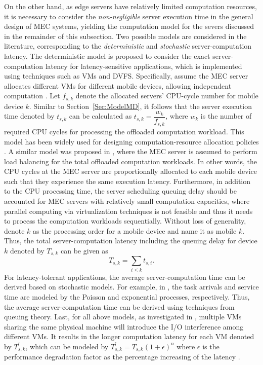 \documentclass[journal]{IEEEtran}
\begin{document}
On the other hand, as edge servers have relatively limited computation resources, it is necessary to consider the \emph{non-negligible} server execution time in the general design of MEC systems, yielding the computation model for the severs discussed in the remainder of this subsection. Two possible models  are considered  in the literature, corresponding to  the \emph{deterministic} and \emph{stochastic} server-computation latency. The deterministic model is proposed to consider the exact server-computation latency  for latency-sensitive applications, which is implemented using  techniques such as VMs and DVFS.
Specifically, assume the MEC server allocates different VMs for different mobile devices, allowing independent computation \cite{barham2003xen}. Let $f_{s,k}$ denote the allocated servers' CPU-cycle number for mobile device $k$. Similar to Section~\ref{Sec:ModelMD}, it follows that the server execution time denoted by $t_{s,k}$ can be calculated as $t_{s,k} = \dfrac{w_k}{f_{{s,k}}}$, where $w_k$ is the number of required CPU cycles for processing the offloaded computation workload. This model has been widely used for designing computation-resource allocation policies  \cite{barbarossa2013joint,chen2015efficient,lyumulti:2016:ProxiCloud}. A similar model was proposed in \cite{you2016energy}, where the MEC server is assumed to perform load balancing for the total offloaded computation workloads. In other words, the CPU cycles at the MEC server are proportionally allocated to each mobile device such that they experience the same execution latency. Furthermore, in addition to the CPU processing time, the server scheduling queuing delay should be accounted for MEC servers with relatively small computation capacities, where parallel computing via virtualization techniques is not feasible and thus it needs to process the computation workloads sequentially. Without loss of generality, denote $k$ as the processing order for a mobile device and name it as mobile $k$. Thus, the total server-computation latency including the queuing delay for device $k$ denoted by $T_{s,k}$ can be given as
\begin{equation}
T_{s,k}=\sum_{i\leq k} t_{s,i}.
\end{equation}
For latency-tolerant applications, the average server-computation time can be derived based on stochastic models. For example, in \cite{vakilinia2015modeling}, the task arrivals and service time are modeled by the Poisson and exponential processes, respectively. Thus, the average server-computation time can be derived using techniques from queuing theory. Last, for all above models, as investigated in \cite{MArmbrust0902}, multiple VMs sharing the same physical machine will introduce the I/O interference among different VMs. It results in the longer computation latency for each VM denoted by $T_{s,k}^{'}$, which can be modeled by $T_{s,k}^{'}=T_{s,k} (1+\epsilon)^n$ where $\epsilon$ is the performance degradation factor as the percentage increasing of the latency \cite{bruneo2014stochastic}.
\end{document}
